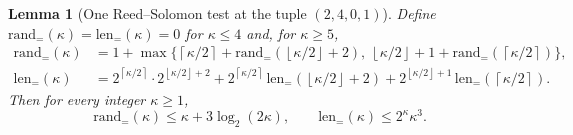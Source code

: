 \documentclass[11pt,letterpaper]{article}
\newtheorem{lemma}[theorem]{Lemma}
\theoremstyle{definition}
\theoremstyle{remark}
\newcommand{\ceil}[1]{\left\lceil #1\right\rceil}
\newcommand{\floor}[1]{\left\lfloor #1\right\rfloor}
\newcommand{\lgx}{\log_2}
\begin{document}
\begin{lemma}[One Reed--Solomon test at the tuple \((2,4,0,1)\)]\label{lem:rs-recursion}
Define \(\mathrm{rand}_=(\kappa)=\mathrm{len}_=(\kappa)=0\) for
\(\kappa\le4\) and, for \(\kappa\ge5\),
\[
\begin{aligned}
 \mathrm{rand}_=(\kappa)&=1+\max\bigl\{\ceil{\kappa/2}
 +\mathrm{rand}_=(\floor{\kappa/2}+2),\
 \floor{\kappa/2}+1+\mathrm{rand}_=(\ceil{\kappa/2})\bigr\},\\
 \mathrm{len}_=(\kappa)&=2^{\ceil{\kappa/2}}\cdot2^{\floor{\kappa/2}+2}
 +2^{\ceil{\kappa/2}}\,\mathrm{len}_=(\floor{\kappa/2}+2)
 +2^{\floor{\kappa/2}+1}\,\mathrm{len}_=(\ceil{\kappa/2}).
\end{aligned}
\]
Then for every integer \(\kappa\ge1\),
\[
 \mathrm{rand}_=(\kappa)\le\kappa+3\lgx(2\kappa),\qquad
 \mathrm{len}_=(\kappa)\le2^\kappa\kappa^3.
\]
\end{lemma}
\end{document}
